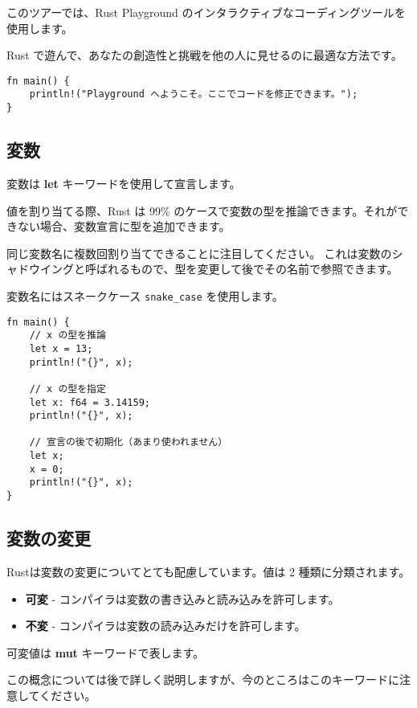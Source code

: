 このツアーでは、Rust Playground
のインタラクティブなコーディングツールを使用します。

Rust で遊んで、あなたの創造性と挑戦を他の人に見せるのに最適な方法です。

\begin{verbatim}
fn main() {
    println!("Playground へようこそ。ここでコードを修正できます。");
}
\end{verbatim}

\subsection{変数}

変数は \textbf{let} キーワードを使用して宣言します。

値を割り当てる際、Rust は 99\%
のケースで変数の型を推論できます。それができない場合、変数宣言に型を追加できます。

同じ変数名に複数回割り当てできることに注目してください。
これは変数のシャドウイングと呼ばれるもので、型を変更して後でその名前で参照できます。

変数名にはスネークケース \texttt{snake\_case} を使用します。

\begin{verbatim}
fn main() {
    // x の型を推論
    let x = 13;
    println!("{}", x);

    // x の型を指定
    let x: f64 = 3.14159;
    println!("{}", x);

    // 宣言の後で初期化（あまり使われません）
    let x;
    x = 0;
    println!("{}", x);
}
\end{verbatim}

\subsection{変数の変更}

Rustは変数の変更についてとても配慮しています。値は 2
種類に分類されます。

\begin{itemize}
\item
  \textbf{可変} - コンパイラは変数の書き込みと読み込みを許可します。
\item
  \textbf{不変} - コンパイラは変数の読み込みだけを許可します。
\end{itemize}

可変値は \textbf{mut} キーワードで表します。

この概念については後で詳しく説明しますが、今のところはこのキーワードに注意してください。

